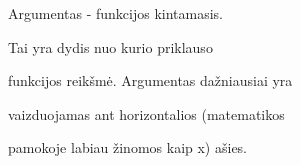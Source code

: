 \documentclass[preview]{standalone}
\begin{document}
\begin{center}
Argumentas - funkcijos kintamasis. 

            Tai yra dydis nuo kurio priklauso 

            funkcijos reikšmė. Argumentas dažniausiai yra 

            vaizduojamas ant horizontalios (matematikos 

            pamokoje labiau žinomos kaip x) ašies.
\end{center}
\end{document}
